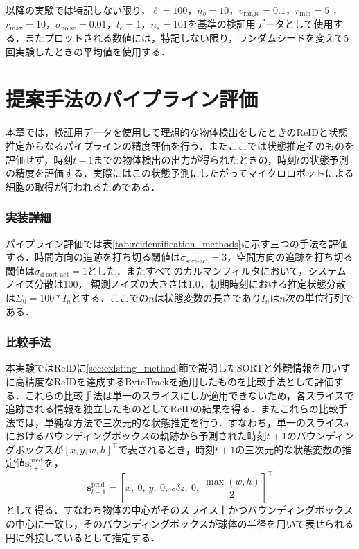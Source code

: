 以降の実験では特記しない限り，$\ell = 100$，$n_b = 10$，$v_{\text{range}} = 0.1$，$r_{\text{min}} = 5$ ，$r_{\text{max}} = 10$，$\sigma_{\text{noise}} = 0.01$，$t_c = 1$，$n_s = 101$を基準の検証用データとして使用する．またプロットされる数値には，特記しない限り，ランダムシードを変えて5回実験したときの平均値を使用する．

\section{提案手法のパイプライン評価}
\label{sec:pipeline_evaluation}

本章では，検証用データを使用して理想的な物体検出をしたときのReIDと状態推定からなるパイプラインの精度評価を行う．またここでは状態推定そのものを評価せず，時刻$t-1$までの物体検出の出力が得られたときの，時刻$t$の状態予測の精度を評価する．実際にはこの状態予測にしたがってマイクロロボットによる細胞の取得が行われるためである．

\subsubsection{実装詳細}
パイプライン評価では表\ref{tab:reidentification_methods}に示す三つの手法を評価する．時間方向の追跡を打ち切る閾値は$\sigma_{\text{sort-act}} = 3$，空間方向の追跡を打ち切る閾値は$\sigma_{\text{d-sort-act}} = 1$とした．またすべてのカルマンフィルタにおいて，システムノイズ分散は$100$，
観測ノイズの大きさは$1.0$，初期時刻における推定状態分散は$\Sigma_0 = 100 * I_n$とする．ここでの$n$は状態変数の長さであり$I_n$は$n$次の単位行列である．

\subsubsection{比較手法}
本実験ではReIDに\ref{sec:existing_method}節で説明したSORTと外観情報を用いずに高精度なReIDを達成するByteTrack\cite{zhang2022bytetrack}を適用したものを比較手法として評価する．これらの比較手法は単一のスライスにしか適用できないため，各スライスで追跡される情報を独立したものとしてReIDの結果を得る．またこれらの比較手法では，単純な方法で三次元的な状態推定を行う．すなわち，単一のスライス$s$におけるバウンディングボックスの軌跡から予測された時刻$t + 1$のバウンディングボックスが$[x, y, w, h]^{\top}$で表されるとき，時刻$t+1$の三次元的な状態変数の推定値$\bm{s}_{t+1}^{\text{pred}}$を，
\begin{equation}
    \label{eq:naive_state_estimation}
    \bm{s}^{\text{pred}}_{t+1} = \left[x,~ 0,~ y,~ 0,~ s \delta z,~ 0,~ \frac{\max(w, h)}{2}\right]^{\top}
\end{equation}
として得る．すなわち物体の中心がそのスライス上かつバウンディングボックスの中心に一致し，そのバウンディングボックスが球体の半径を用いて表せられる円に外接しているとして推定する．

